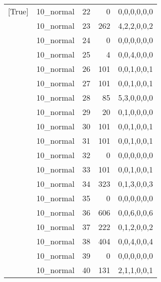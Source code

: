 \begin{tabular}{llrrl}
 [True]          & 10\_normal           &            22 &                     0 & 0,0,0,0,0,0   \\
 [True]          & 10\_normal           &            23 &                   262 & 4,2,2,0,0,2   \\
 [True]          & 10\_normal           &            24 &                     0 & 0,0,0,0,0,0   \\
 [True]          & 10\_normal           &            25 &                     4 & 0,0,4,0,0,0   \\
 [True]          & 10\_normal           &            26 &                   101 & 0,0,1,0,0,1   \\
 [True]          & 10\_normal           &            27 &                   101 & 0,0,1,0,0,1   \\
 [True]          & 10\_normal           &            28 &                    85 & 5,3,0,0,0,0   \\
 [True]          & 10\_normal           &            29 &                    20 & 0,1,0,0,0,0   \\
 [True]          & 10\_normal           &            30 &                   101 & 0,0,1,0,0,1   \\
 [True]          & 10\_normal           &            31 &                   101 & 0,0,1,0,0,1   \\
 [True]          & 10\_normal           &            32 &                     0 & 0,0,0,0,0,0   \\
 [True]          & 10\_normal           &            33 &                   101 & 0,0,1,0,0,1   \\
 [True]          & 10\_normal           &            34 &                   323 & 0,1,3,0,0,3   \\
 [True]          & 10\_normal           &            35 &                     0 & 0,0,0,0,0,0   \\
 [True]          & 10\_normal           &            36 &                   606 & 0,0,6,0,0,6   \\
 [True]          & 10\_normal           &            37 &                   222 & 0,1,2,0,0,2   \\
 [True]          & 10\_normal           &            38 &                   404 & 0,0,4,0,0,4   \\
 [True]          & 10\_normal           &            39 &                     0 & 0,0,0,0,0,0   \\
 [True]          & 10\_normal           &            40 &                   131 & 2,1,1,0,0,1   \\

\end{tabular}
